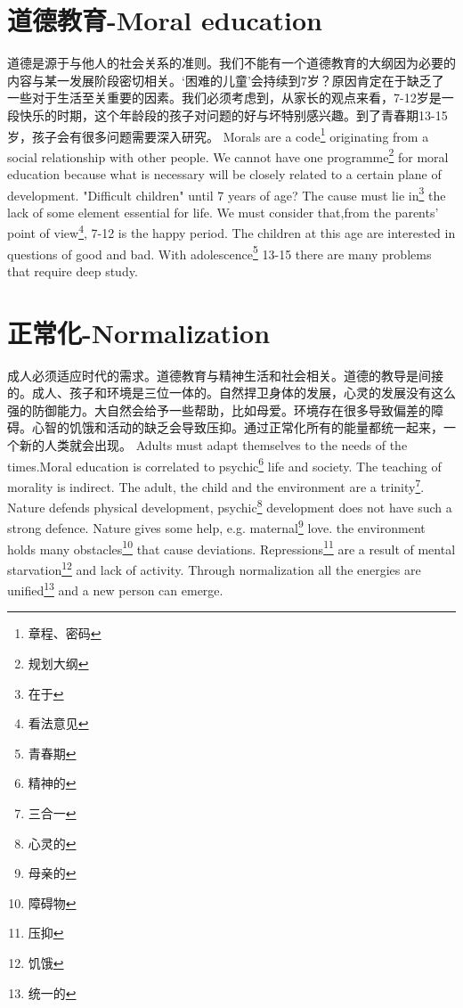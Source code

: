 \documentclass[lang=cn,10pt]{elegantbook}
\begin{document}
\chapter{道德教育-Moral education}

\begin{tcolorbox}[title=摘要,
colback=red!5!white,
colframe=red!75!black,
fonttitle=\bfseries]
道德是源于与他人的社会关系的准则。我们不能有一个道德教育的大纲因为必要的内容与某一发展阶段密切相关。‘困难的儿童’会持续到7岁？原因肯定在于缺乏了一些对于生活至关重要的因素。我们必须考虑到，从家长的观点来看，7-12岁是一段快乐的时期，这个年龄段的孩子对问题的好与坏特别感兴趣。到了青春期13-15岁，孩子会有很多问题需要深入研究。
Morals are a code\footnote{章程、密码} originating from a social relationship with other people. We cannot have one programme\footnote{规划大纲} for moral education because what is necessary will be closely related to a certain plane of development. "Difficult children" until 7 years of age? The cause must lie in\footnote{在于} the lack of some element essential for life. We must consider that,from the parents' point of view\footnote{看法意见}, 7-12 is the happy period. The children at this age are interested in questions of good and bad. With adolescence\footnote{青春期} 13-15 there are many problems that require deep study.
\end{tcolorbox}

\chapter{正常化-Normalization}

\begin{tcolorbox}[title=摘要,
colback=red!5!white,
colframe=red!75!black,
fonttitle=\bfseries]
成人必须适应时代的需求。道德教育与精神生活和社会相关。道德的教导是间接的。成人、孩子和环境是三位一体的。自然捍卫身体的发展，心灵的发展没有这么强的防御能力。大自然会给予一些帮助，比如母爱。环境存在很多导致偏差的障碍。心智的饥饿和活动的缺乏会导致压抑。通过正常化所有的能量都统一起来，一个新的人类就会出现。
Adults must adapt themselves to the needs of the times.Moral education is correlated to psychic\footnote{精神的} life and society. The teaching of morality is indirect. The adult, the child and the environment are a trinity\footnote{三合一}. Nature defends physical development, psychic\footnote{心灵的} development does not have such a strong defence. Nature gives some help, e.g. maternal\footnote{母亲的} love. the environment holds many obstacles\footnote{障碍物} that cause deviations. Repressions\footnote{压抑} are a result of mental starvation\footnote{饥饿} and lack of activity. Through normalization all the energies are unified\footnote{统一的} and a new person can emerge.
\end{tcolorbox}
\end{document}
